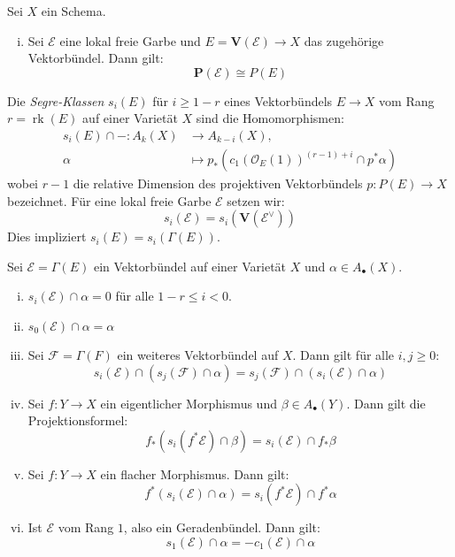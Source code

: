 \documentclass[10pt,b5paper]{article}
\begin{document}
\begin{proposition}
Sei $X$ ein Schema.
\begin{enumerate}[(i)]
\item Sei $\mathcal{E}$ eine lokal freie Garbe und $E=\mathbf{V}(\mathcal{E})\to X$ das zugehörige Vektorbündel. Dann gilt:
\[ \mathbf{P}(\mathcal{E})\cong P(E) \]
\end{enumerate}
\end{proposition}

\begin{definition}
Die \textit{Segre-Klassen} $s_i(E)$ für $i\geq 1-r$ eines Vektorbündels $E\to X$ vom Rang $r = \operatorname{rk}(E)$ auf einer Varietät $X$ sind die Homomorphismen:
\begin{align*}
s_i(E)\cap -: A_k(X)&\to A_{k-i}(X),\\ 
\alpha&\mapsto p_\ast(c_1(\mathcal{O}_E(1))^{(r-1)+i} \cap p^\ast\alpha)
\end{align*}
wobei $r-1$ die relative Dimension des projektiven Vektorbündels $p: P(E)\to X$ bezeichnet. Für eine lokal freie Garbe $\mathcal{E}$ setzen wir:
\[ s_i(\mathcal{E})= s_i(\mathbf{V}(\mathcal{E}^\vee)) \]
Dies impliziert $s_i(E) = s_i(\Gamma(E))$.
\end{definition}

\begin{proposition}
Sei $\mathcal{E} = \Gamma(E)$ ein Vektorbündel auf einer Varietät $X$ und $\alpha\in A_\bullet(X)$.
\begin{enumerate}[(i)]
\item $s_i(\mathcal{E})\cap\alpha = 0$ für alle $1-r\leq i <0$.
\item $s_0(\mathcal{E})\cap\alpha = \alpha$
\item Sei $\mathcal{F} = \Gamma(F)$ ein weiteres Vektorbündel auf $X$. Dann gilt für alle $i,j\geq 0$:
\[ s_i(\mathcal{E})\cap (s_j(\mathcal{F}) \cap \alpha) = s_j(\mathcal{F}) \cap (s_i(\mathcal{E})\cap \alpha) \]
\item Sei $f:Y\to X$ ein eigentlicher Morphismus und $\beta\in A_\bullet(Y)$. Dann gilt die Projektionsformel:
\[ f_\ast(s_i(f^\ast\mathcal{E})\cap\beta) = s_i(\mathcal{E})\cap f_\ast\beta \]
\item Sei $f:Y\to X$ ein flacher Morphismus. Dann gilt:
\[ f^\ast(s_i(\mathcal{E})\cap \alpha) = s_i(f^\ast\mathcal{E})\cap f^\ast\alpha \]
\item Ist $\mathcal{E}$ vom Rang $1$, also ein Geradenbündel. Dann gilt:
\[ s_1(\mathcal{E}) \cap\alpha = -c_1(\mathcal{E})\cap \alpha \]
\end{enumerate}
\end{proposition}
\end{document}
